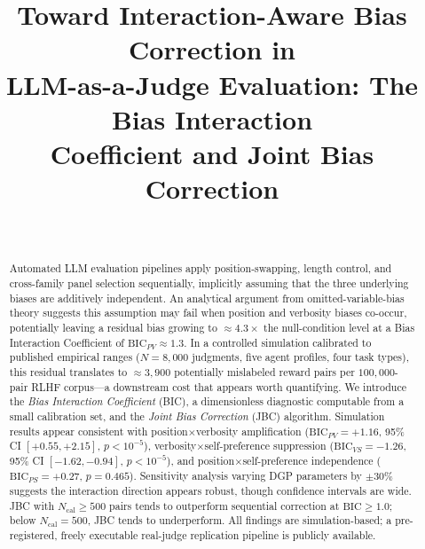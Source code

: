 \documentclass[10pt,conference]{IEEEtran}
\newcommand{\BIC}{\mathrm{BIC}}
\begin{document}
\title{Toward Interaction-Aware Bias Correction in\\
LLM-as-a-Judge Evaluation: The Bias Interaction\\
Coefficient and Joint Bias Correction}

\author{%
  \\
}

\maketitle

\begin{abstract}
Automated LLM evaluation pipelines apply position-swapping,
length control, and cross-family panel selection sequentially,
implicitly assuming that the three underlying biases are
additively independent.
An analytical argument from omitted-variable-bias theory
suggests this assumption may fail when position and
verbosity biases co-occur, potentially leaving a residual
bias growing to ${\approx}4.3{\times}$ the null-condition
level at a Bias Interaction Coefficient of $\BIC_{PV}{\approx}1.3$.
In a controlled simulation calibrated to published
empirical ranges ($N{=}8{,}000$ judgments, five agent profiles,
four task types), this residual translates to
${\approx}3{,}900$ potentially mislabeled reward pairs
per $100{,}000$-pair RLHF corpus---a downstream cost
that appears worth quantifying.
We introduce the \textit{Bias Interaction Coefficient}
(BIC), a dimensionless diagnostic computable from a
small calibration set, and the \textit{Joint Bias Correction}
(JBC) algorithm.
Simulation results appear consistent with position$\times$verbosity
amplification ($\BIC_{PV}{=}{+}1.16$, 95\% CI $[{+}0.55,{+}2.15]$,
$p{<}10^{-5}$), verbosity$\times$self-preference suppression
($\BIC_{VS}{=}{-}1.26$, 95\% CI $[-1.62,-0.94]$, $p{<}10^{-5}$),
and position$\times$self-preference independence
($\BIC_{PS}{=}{+}0.27$, $p{=}0.465$).
Sensitivity analysis varying DGP parameters by $\pm 30\%$
suggests the interaction direction appears robust,
though confidence intervals are wide.
JBC with $N_\text{cal}{\geq}500$ pairs tends to outperform
sequential correction at $\BIC{\geq}1.0$;
below $N_\text{cal}{=}500$, JBC tends to underperform.
All findings are simulation-based; a pre-registered,
freely executable real-judge replication pipeline
is publicly available.
\end{abstract}
\end{document}
